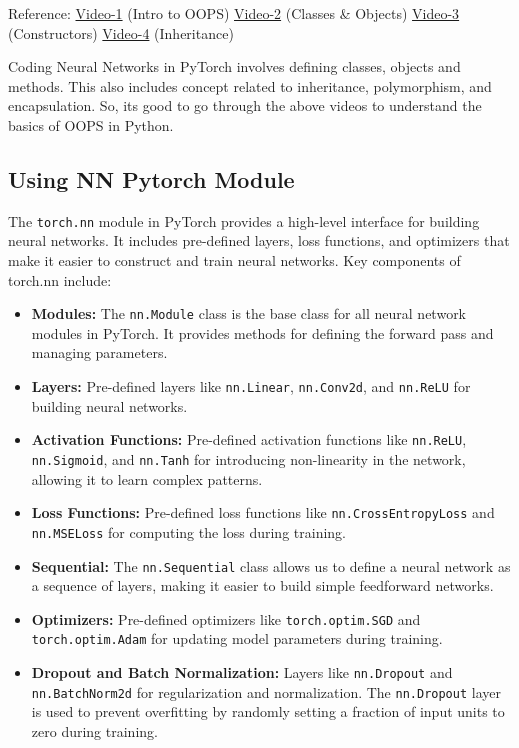 \documentclass[12pt, a4paper]{article}
\begin{document}
Reference: \href{https://www.youtube.com/watch?v=HQnoYzxOHMw}{Video-1} (Intro to OOPS) \href{https://youtu.be/a7baAGCBA9U?si=dic4GqzG0pJtPffX}{Video-2} (Classes \& Objects) \href{https://youtu.be/12HRkYld22c?si=2YsB6D_8Efi1Otr0}{Video-3} (Constructors) \href{https://youtu.be/6soT3DMBJGQ?si=9a_6DyX1GmZFHFg9}{Video-4} (Inheritance) 

\vspace{0.5em}

Coding Neural Networks in PyTorch involves defining classes, objects and methods. This also includes concept related to inheritance, polymorphism, and encapsulation. So, its good to go through the above videos to understand the basics of OOPS in Python.

\subsection{Using NN Pytorch Module}
The \texttt{torch.nn} module in PyTorch provides a high-level interface for building neural networks. It includes pre-defined layers, loss functions, and optimizers that make it easier to construct and train neural networks.
Key components of torch.nn include:
\begin{itemize}[nosep]
    \item \textbf{Modules:} The \texttt{nn.Module} class is the base class for all neural network modules in PyTorch. It provides methods for defining the forward pass and managing parameters.
    \item \textbf{Layers:} Pre-defined layers like \texttt{nn.Linear}, \texttt{nn.Conv2d}, and \texttt{nn.ReLU} for building neural networks.
    \item \textbf{Activation Functions:} Pre-defined activation functions like \texttt{nn.ReLU}, \texttt{nn.Sigmoid}, and \texttt{nn.Tanh} for introducing non-linearity in the network, allowing it to learn complex patterns.
    \item \textbf{Loss Functions:} Pre-defined loss functions like \texttt{nn.CrossEntropyLoss} and \texttt{nn.MSELoss} for computing the loss during training.
    \item \textbf{Sequential:} The \texttt{nn.Sequential} class allows us to define a neural network as a sequence of layers, making it easier to build simple feedforward networks.
    \item \textbf{Optimizers:} Pre-defined optimizers like \texttt{torch.optim.SGD} and \texttt{torch.optim.Adam} for updating model parameters during training.
    \item \textbf{Dropout and Batch Normalization:} Layers like \texttt{nn.Dropout} and \texttt{nn.BatchNorm2d} for regularization and normalization. The \texttt{nn.Dropout} layer is used to prevent overfitting by randomly setting a fraction of input units to zero during training.
\end{itemize}
\end{document}
